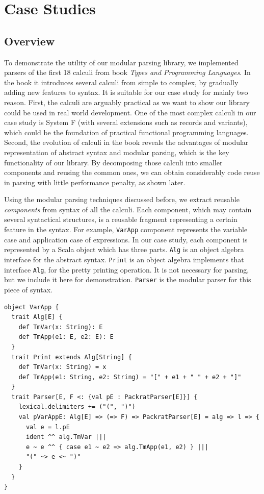 \section{Case Studies}\label{sec:casestudy}

\subsection{Overview}\label{subsec:cs-overview}

To demonstrate the utility of our modular parsing library, we implemented parsers of the first 18 calculi from book \textit{Types and Programming Languages}. In the book it introduces several calculi from simple to complex, by gradually adding new features to syntax. It is suitable for our case study for mainly two reason. First, the calculi are arguably practical as we want to show our library could be used in real world development. One of the most complex calculi in our case study is System F (with several extensions such as records and variants), which could be the foundation of practical functional programming languages. Second, the evolution of calculi in the book reveals the advantages of modular representation of abstract syntax and modular parsing, which is the key functionality of our library. By decomposing those calculi into smaller components and reusing the common ones, we can obtain considerably code reuse in parsing with little performance penalty, as shown later.

Using the modular parsing techniques discussed before, we extract reusable \textit{components} from syntax of all the calculi. Each component, which may contain several syntactical structures, is a reusable fragment representing a certain feature in the syntax. For example, \lstinline{VarApp} component represents the variable case and application case of expressions. In our case study, each component is represented by a Scala object which has three parts. \lstinline{Alg} is an object algebra interface for the abstract syntax. \lstinline{Print} is an object algebra implements that interface \lstinline{Alg}, for the pretty printing operation. It is not necessary for parsing, but we include it here for demonstration. \lstinline{Parser} is the modular parser for this piece of syntax.

\begin{lstlisting}
object VarApp {
  trait Alg[E] {
    def TmVar(x: String): E
    def TmApp(e1: E, e2: E): E
  }
  trait Print extends Alg[String] {
    def TmVar(x: String) = x
    def TmApp(e1: String, e2: String) = "[" + e1 + " " + e2 + "]"
  }
  trait Parser[E, F <: {val pE : PackratParser[E]}] {
    lexical.delimiters += ("(", ")")
    val pVarAppE: Alg[E] => (=> F) => PackratParser[E] = alg => l => {
      val e = l.pE
      ident ^^ alg.TmVar |||
      e ~ e ^^ { case e1 ~ e2 => alg.TmApp(e1, e2) } |||
      "(" ~> e <~ ")"
    }
  }
}
\end{lstlisting}

